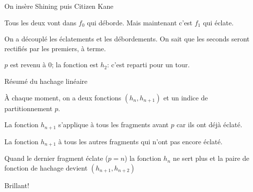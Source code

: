 \begin{frame}{On insère Shining puis Citizen Kane}

Tous les deux vont dans $f_0$ qui déborde.  \alert{Mais maintenant c'est $f_1$
qui éclate}. 
\vfill



\vfill

\begin{blocgauche}
On a \alert{découplé} les éclatements et les débordements. On sait que 
les seconds seront rectifiés par les premiers, \alert{à terme}. 

\smallskip

 $p$ est revenu à 0; la fonction est $h_2$: c'est reparti pour un tour.
\end{blocgauche}

\end{frame}



\begin{frame}{Résumé du hachage linéaire}

À chaque moment, on a deux fonctions $(h_{n}, h_{n+1})$ et un indice
de partitionnement $p$.

\vfill

\begin{redbullet}
  \item La fonction $h_{n+1}$ s'applique à tous les fragments \alert{avant} $p$
       car ils ont déjà éclaté.
     \item La fonction $h_{n+1}$ à tous les autres fragments qui n'ont pas
       encore éclaté.
\end{redbullet}

\vfill

Quand le dernier fragment éclate ($p=n$) la fonction $h_n$ ne sert plus et la
paire de fonction de hachage devient $(h_{n+1}, h_{n+2})$
  

\vfill

Brillant!
\end{frame}